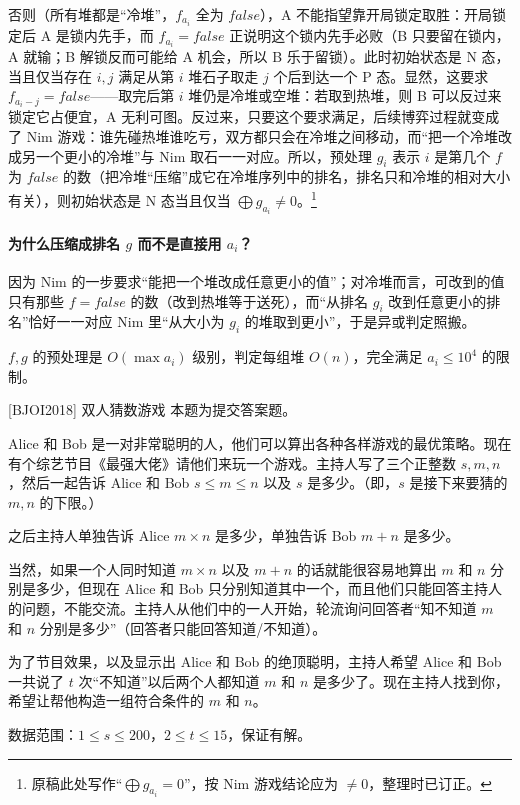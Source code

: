 否则（所有堆都是“冷堆”，$f_{a_i}$ 全为 $false$），A 不能指望靠开局锁定取胜：开局锁定后 A 是锁内先手，而 $f_{a_i}=false$ 正说明这个锁内先手必败（B 只要留在锁内，A 就输；B 解锁反而可能给 A 机会，所以 B 乐于留锁）。此时初始状态是 N 态，当且仅当存在 $i,j$ 满足从第 $i$ 堆石子取走 $j$ 个后到达一个 P 态。显然，这要求 $f_{a_i-j}=false$——取完后第 $i$ 堆仍是冷堆或空堆：若取到热堆，则 B 可以反过来锁定它占便宜，A 无利可图。反过来，只要这个要求满足，后续博弈过程就变成了 Nim 游戏：谁先碰热堆谁吃亏，双方都只会在冷堆之间移动，而“把一个冷堆改成另一个更小的冷堆”与 Nim 取石一一对应。所以，预处理 $g_i$ 表示 $i$ 是第几个 $f$ 为 $false$ 的数（把冷堆“压缩”成它在冷堆序列中的排名，排名只和冷堆的相对大小有关），则初始状态是 N 态当且仅当 $\bigoplus g_{a_i}\ne0$。\footnote{原稿此处写作“$\bigoplus g_{a_i}=0$”，按 Nim 游戏结论应为 $\ne0$，整理时已订正。}

\paragraph{为什么压缩成排名 $g$ 而不是直接用 $a_i$？} 因为 Nim 的一步要求“能把一个堆改成任意更小的值”；对冷堆而言，可改到的值只有那些 $f=false$ 的数（改到热堆等于送死），而“从排名 $g_i$ 改到任意更小的排名”恰好一一对应 Nim 里“从大小为 $g_i$ 的堆取到更小”，于是异或判定照搬。

\cost $f,g$ 的预处理是 $O(\max a_i)$ 级别，判定每组堆 $O(n)$，完全满足 $a_i\le10^{4}$ 的限制。

\begin{problem}{[BJOI2018] 双人猜数游戏}
本题为提交答案题。

Alice 和 Bob 是一对非常聪明的人，他们可以算出各种各样游戏的最优策略。现在有个综艺节目《最强大佬》请他们来玩一个游戏。主持人写了三个正整数 $s,m,n$，然后一起告诉 Alice 和 Bob $s\le m\le n$ 以及 $s$ 是多少。（即，$s$ 是接下来要猜的 $m,n$ 的下限。）

之后主持人单独告诉 Alice $m\times n$ 是多少，单独告诉 Bob $m+n$ 是多少。

当然，如果一个人同时知道 $m\times n$ 以及 $m+n$ 的话就能很容易地算出 $m$ 和 $n$ 分别是多少，但现在 Alice 和 Bob 只分别知道其中一个，而且他们只能回答主持人的问题，不能交流。主持人从他们中的一人开始，轮流询问回答者“知不知道 $m$ 和 $n$ 分别是多少”（回答者只能回答知道/不知道）。

为了节目效果，以及显示出 Alice 和 Bob 的绝顶聪明，主持人希望 Alice 和 Bob 一共说了 $t$ 次“不知道”以后两个人都知道 $m$ 和 $n$ 是多少了。现在主持人找到你，希望让帮他构造一组符合条件的 $m$ 和 $n$。

数据范围：$1\le s\le200$，$2\le t\le15$，保证有解。
\end{problem}

